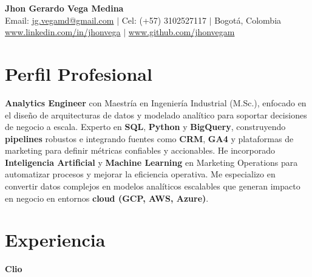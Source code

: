 \documentclass[9pt, letterpaper]{extarticle}
\begin{document}
\setlength{\parindent}{0pt}
    \begin{center}
        {\Huge \textbf{Jhon Gerardo Vega Medina}} \\ \vspace{6pt}
        Email: \href{mailto:jg.vegamd@gmail.com}{jg.vegamd@gmail.com} $\vert$
        Cel: (+57) 3102527117 $\vert$
        Bogotá, Colombia \\ \vspace{3pt}
        \href{https://www.linkedin.com/in/jhonvega}{www.linkedin.com/in/jhonvega} $\vert$
        \href{https://www.github.com/jhonvegam}{www.github.com/jhonvegam}
    \end{center}

    \section*{Perfil Profesional}
        \textbf{Analytics Engineer} con Maestría en Ingeniería Industrial (M.Sc.), enfocado en el diseño de arquitecturas de datos y modelado analítico para soportar decisiones de negocio a escala. Experto en \textbf{SQL}, \textbf{Python} y \textbf{BigQuery}, construyendo \textbf{pipelines} robustos e integrando fuentes como \textbf{CRM}, \textbf{GA4} y plataformas de marketing para definir métricas confiables y accionables.
    \vspace{5pt}
        He incorporado \textbf{Inteligencia Artificial} y \textbf{Machine Learning} en Marketing Operations para automatizar procesos y mejorar la eficiencia operativa. Me especializo en convertir datos complejos en modelos analíticos escalables que generan impacto en negocio en entornos \textbf{cloud (GCP, AWS, Azure)}.

    \section*{Experiencia}

        \noindent \textbf{Clio}
        
\end{document}
